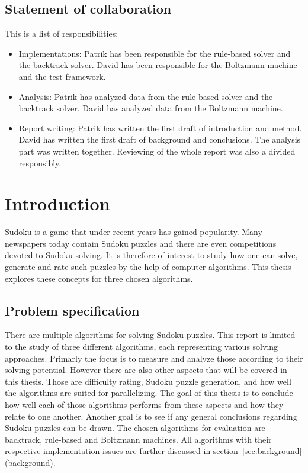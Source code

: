 \documentclass[a4paper,11pt]{kth-mag}
\begin{document}
\section{Statement of collaboration}
This is a list of responsibilities:
\begin{itemize}
    \item Implementations: Patrik has been responsible for the rule-based solver and the backtrack solver. David has been responsible for the Boltzmann machine and the test framework.
    \item Analysis: Patrik has analyzed data from the rule-based solver and the backtrack solver. David has analyzed data from the Boltzmann machine.
    \item Report writing: Patrik has written the first draft of introduction and method. David has written the first draft of background and conclusions. The analysis part was written together. Reviewing of the whole report was also a divided responsibly.
\end{itemize}

\clearpage
\tableofcontents*
\clearpage
\listoffigures*
\mainmatter
\pagestyle{newchap}

\chapter{Introduction}
Sudoku is a game that under recent years has gained popularity.
Many newspapers today contain Sudoku puzzles and there are even competitions devoted to Sudoku solving.
It is therefore of interest to study how one can solve, generate and rate such puzzles by the help of computer algorithms. This thesis explores these concepts for three chosen algorithms.

\FloatBarrier
\section{Problem specification}
There are multiple algorithms for solving Sudoku puzzles.
This report is limited to the study of three different algorithms, each representing various solving approaches.
Primarly the focus is to measure and analyze those according to their solving potential.
However there are also other aspects that will be covered in this thesis.
Those are difficulty rating, Sudoku puzzle generation, and how well the algorithms are suited for parallelizing.
The goal of this thesis is to conclude how well each of those algorithms performs from these aspects and how they relate to one another.
Another goal is to see if any general conclusions regarding Sudoku puzzles can be drawn.
The chosen algorithms for evaluation are backtrack, rule-based and Boltzmann machines.
All algorithms with their respective implementation issues are further discussed in section~\ref{sec:background} (background).
\end{document}
